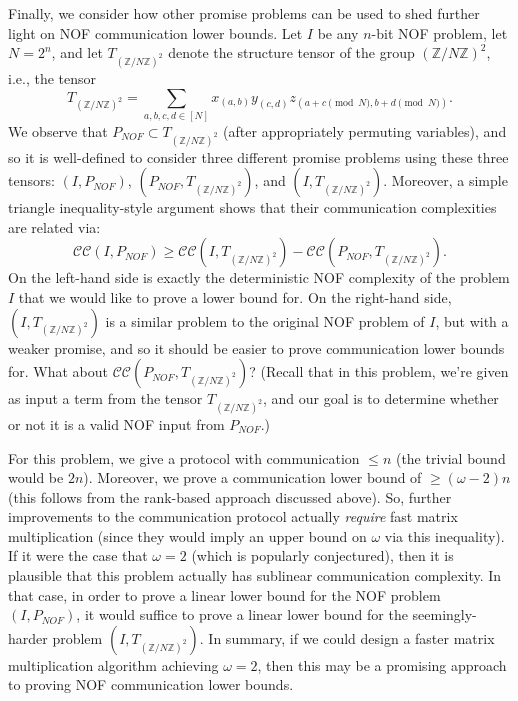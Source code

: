 \documentclass[10pt,a4paper]{article}
\newcommand{\cc}{\mathcal{CC}}
\begin{document}
     Finally, we consider how other promise problems can be used to shed further light on NOF communication lower bounds. Let $I$ be any $n$-bit NOF problem, let $N = 2^n$, and let $T_{(\mathbb{Z} / N\mathbb{Z})^2}$ denote the structure tensor of the group $(\mathbb{Z} / N\mathbb{Z})^2$, i.e., the tensor
$$T_{(\mathbb{Z} / N\mathbb{Z})^2} = \sum_{a,b,c,d \in [N]} x_{(a,b)} y_{(c,d)} z_{(a+c\pmod{N}, b+d\pmod{N})}.$$
    We observe that $P_{NOF} \subset T_{(\mathbb{Z} / N\mathbb{Z})^2}$ (after appropriately permuting variables), and so it is well-defined to consider three different promise problems using these three tensors: $(I,P_{NOF})$, $(P_{NOF},T_{(\mathbb{Z} / N\mathbb{Z})^2})$, and $(I,T_{(\mathbb{Z} / N\mathbb{Z})^2})$. Moreover, a simple triangle inequality-style argument shows that their communication complexities are related via:
    $$\cc(I,P_{NOF}) \geq \cc(I,T_{(\mathbb{Z} / N\mathbb{Z})^2}) - \cc(P_{NOF},T_{(\mathbb{Z} / N\mathbb{Z})^2}).$$
    On the left-hand side is exactly the deterministic NOF complexity of the problem $I$ that we would like to prove a lower bound for. On the right-hand side, $(I,T_{(\mathbb{Z} / N\mathbb{Z})^2})$ is a similar problem to the original NOF problem of $I$, but with a weaker promise, and so it should be easier to prove communication lower bounds for. What about $\cc(P_{NOF},T_{(\mathbb{Z} / N\mathbb{Z})^2})$? (Recall that in this problem, we're given as input a term from the tensor $T_{(\mathbb{Z} / N\mathbb{Z})^2}$, and our goal is to determine whether or not it is a valid NOF input from $P_{NOF}$.)

    For this problem, we give a protocol with communication $\leq n$ (the trivial bound would be $2n$). Moreover, we prove a communication lower bound of $\geq (\omega - 2) n$ (this follows from the rank-based approach discussed above). So, further improvements to the communication protocol actually \emph{require} fast matrix multiplication (since they would imply an upper bound on $\omega$ via this inequality). If it were the case that $\omega = 2$ (which is popularly conjectured), then it is plausible that this problem actually has sublinear communication complexity. In that case, in order to prove a linear lower bound for the NOF problem $(I,P_{NOF})$, it would suffice to prove a linear lower bound for the seemingly-harder problem $(I,T_{(\mathbb{Z} / N\mathbb{Z})^2})$. In summary, if we could design a faster matrix multiplication algorithm achieving $\omega=2$, then this may be a promising approach to proving NOF communication lower bounds.
\end{document}
